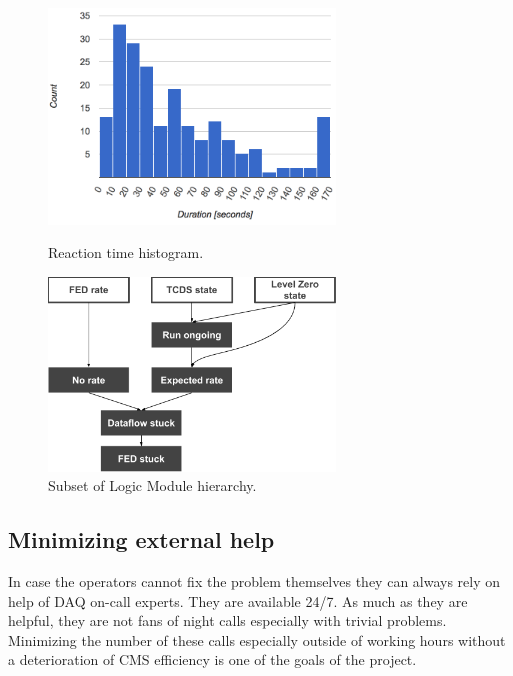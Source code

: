 \documentclass[a4paper]{jpconf}
\begin{document}
\begin{figure}[h]
\begin{minipage}{18pc}
\includegraphics[width=18pc]{reaction-histogram.png}
\caption{\label{reaction-histogram}Reaction time histogram.}
\end{minipage}\hspace{2pc}%
\begin{minipage}{18pc}
\includegraphics[width=18pc]{logic-module-hierarchy2.png}
\caption{\label{subsetoflm}Subset of Logic Module hierarchy.}
\end{minipage} 
\end{figure}



\subsection{Minimizing external help}
In case the operators cannot fix the problem themselves they can always rely on help of DAQ on-call experts. They are available 24/7. As much as they are helpful, they are not fans of night calls especially with trivial problems. Minimizing the number of these calls especially outside of working hours without a deterioration of CMS efficiency is one of the goals of the project.
\end{document}

